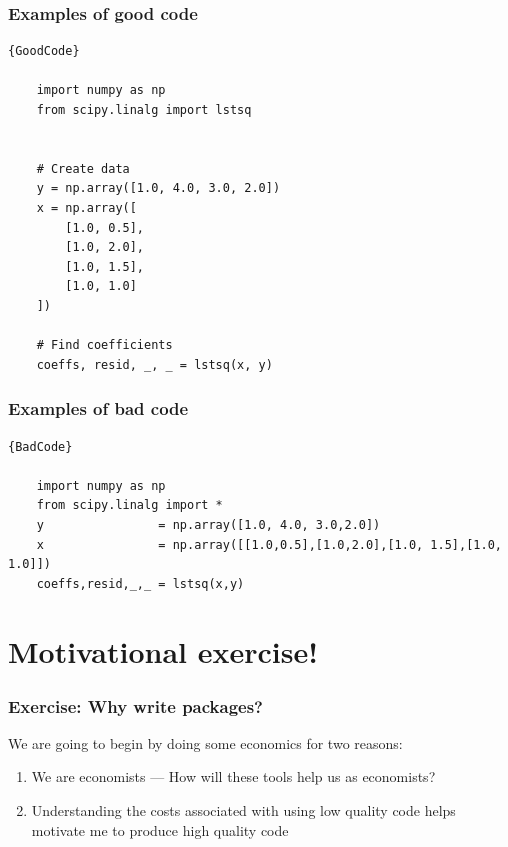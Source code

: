 \documentclass[10pt]{beamer}
\begin{document}
  \begin{frame}[fragile] \frametitle{Examples of good code}

    {\small
    \begin{lstlisting}{GoodCode}

    import numpy as np
    from scipy.linalg import lstsq


    # Create data
    y = np.array([1.0, 4.0, 3.0, 2.0])
    x = np.array([
        [1.0, 0.5],
        [1.0, 2.0],
        [1.0, 1.5],
        [1.0, 1.0]
    ])

    # Find coefficients
    coeffs, resid, _, _ = lstsq(x, y)

    \end{lstlisting}
    }

  \end{frame}

  \begin{frame}[fragile] \frametitle{Examples of bad code}

    {\small
    \begin{lstlisting}{BadCode}

    import numpy as np
    from scipy.linalg import *
    y                = np.array([1.0, 4.0, 3.0,2.0])
    x                = np.array([[1.0,0.5],[1.0,2.0],[1.0, 1.5],[1.0, 1.0]])
    coeffs,resid,_,_ = lstsq(x,y)

    \end{lstlisting}
    }

  \end{frame}



\section{Motivational exercise!}

  \begin{frame} \frametitle{Exercise: Why write packages?}

    We are going to begin by doing some economics for two reasons:

    \begin{enumerate}
      \item We are economists --- How will these tools help us as economists?
      \item Understanding the costs associated with using low quality code helps
        motivate me to produce high quality code
    \end{enumerate}

  \end{frame}
\end{document}
